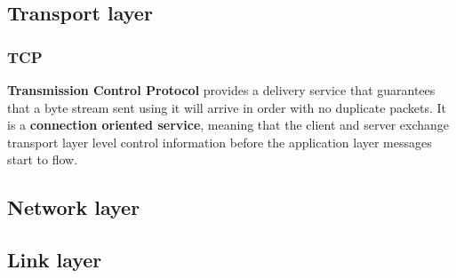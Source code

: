 \subsection{Transport layer}

\subsubsection{TCP}
\textbf{Transmission Control Protocol} provides a delivery service that guarantees that a byte stream sent using it will arrive in order with no duplicate packets. It is a \textbf{connection oriented service}, meaning that the client and server exchange transport layer level control information before the application layer messages start to flow.


\subsection{Network layer}
\subsection{Link layer}
